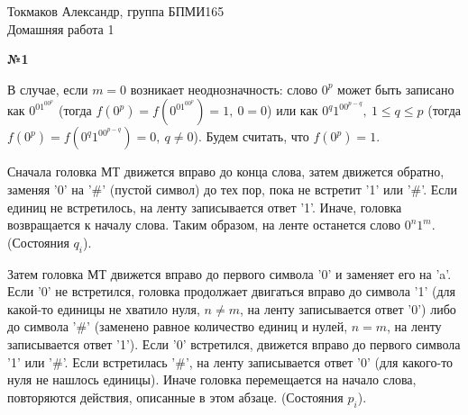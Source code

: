 \documentclass{article}
\newenvironment{task}{\begin{center}\fontsize{14}{14}\selectfont\bf}{\rm\fontsize{12}{12}\selectfont\end{center}}
\begin{document}
	\begin{center}
		Токмаков Александр, группа БПМИ165 \\
		Домашняя работа 1
	\end{center}

	
	\begin{task} 
		№1
	\end{task}

	В случае, если $m = 0$ возникает неоднозначность: слово $0^p$ может быть записано как $0^01^00^p$ (тогда $f(0^p) = f(0^01^00^p) = 1, \ 0 = 0$) или как $0^q1^00^{p-q}, \ 1 \leq q \leq p$ (тогда $f(0^p) = f(0^q1^00^{p-q}) = 0, \ q \not= 0$). Будем считать, что $f(0^p) = 1$. 
	
	Сначала головка МТ движется вправо до конца слова, затем движется обратно, заменяя '0' на '\#' (пустой символ) до тех пор, пока не встретит '1' или '\#'. Если единиц не встретилось, на ленту записывается ответ '1'. Иначе, головка возвращается к началу слова. Таким образом, на ленте останется слово $0^n1^m$. (Состояния $q_i$).
	
	Затем головка МТ движется вправо до первого символа '0' и заменяет его на 'a'. Если '0' не встретился, головка продолжает двигаться вправо до символа '1' (для какой-то единицы не хватило нуля, $n \not = m$, на ленту записывается ответ '0') либо до символа '\#' (заменено равное количество единиц и нулей, $n = m$, на ленту записывается ответ '1'). Если '0' встретился, движется вправо до первого символа '1' или '\#'. Если встретилась '\#', на ленту записывается ответ '0' (для какого-то нуля не нашлось единицы). Иначе головка перемещается на начало слова, повторяются действия, описанные в этом абзаце. (Состояния $p_i$).
	
\end{document}
